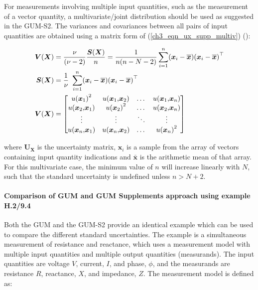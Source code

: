 \documentclass[../thesis/thesis.tex]{subfiles}
\begin{document}
\begin{refsection}
For measurements involving multiple input quantities, such as the measurement of a vector quantity, a multivariate/joint distribution should be used as suggested in the GUM-S2. The variances and covariances between all pairs of input quantities are obtained using a matrix form of (\ref{ch3_eqn_ux_supp_multiv}) (\cite[Section~5.3.2]{GUM_S2}):

\begin{align}
\boldsymbol V(\boldsymbol X) & = \frac\nu{(\nu-2)}\frac{\boldsymbol S(\boldsymbol X)}n=\frac1{n(n-N-2)}\sum_{i=1}^n({\boldsymbol x}_i-\overline{\boldsymbol x}){({\boldsymbol x}_i-\overline{\boldsymbol x})}^\top
\\
\boldsymbol S(\boldsymbol X) & = \frac1\nu\hspace{0.35em}\sum_{i=1}^n({\boldsymbol x}_i-\overline{\boldsymbol x}){({\boldsymbol x}_i-\overline{\boldsymbol x})}^\top
\\
\boldsymbol V(\boldsymbol X) & = 
\begin{bmatrix}
u{({\boldsymbol x}_1)}^2&u({\boldsymbol x}_1\text{,}{\boldsymbol x}_2)&\dots&u({\boldsymbol x}_1\text{,}{\boldsymbol x}_n)\\
u({\boldsymbol x}_2\text{,}{\boldsymbol x}_1)&u{({\boldsymbol x}_2)}^2&\dots&u({\boldsymbol x}_2\text{,}{\boldsymbol x}_n)\\
\vdots&\vdots&\ddots&\vdots\\
u({\boldsymbol x}_n\text{,}{\boldsymbol x}_1)&u({\boldsymbol x}_n\text{,}{\boldsymbol x}_2)&\dots&u{({\boldsymbol x}_n)}^2
\end{bmatrix}
\end{align}

where $\bm{U_X}$ is the uncertainty matrix, $\bm{x}_i$ is a sample from the array of vectors containing input quantity indications and $\bar{\bm{x}}$ is the arithmetic mean of that array. For this multivariate case, the minimum value of $n$ will increase linearly with $N$, such that the standard uncertainty is undefined unless $n > N + 2$.

\paragraph{Comparison of GUM and GUM Supplements approach using example H.2/9.4}

Both the GUM and the GUM-S2 provide an identical example which can be used to compare the different standard uncertainties. The example is a simultaneous measurement of resistance and reactance, which uses a measurement model with multiple input quantities and multiple output quantities (measurands). The input quantities are voltage $V$, current, $I$, and phase, $\phi$, and the measurands are resistance $R$, reactance, $X$, and impedance, $Z$. The measurement model is defined as:


\end{refsection}
\end{document}

